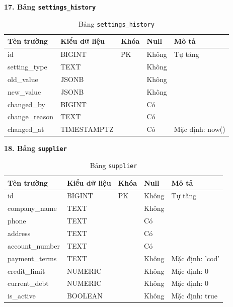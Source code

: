 \documentclass[12pt,a4paper]{report}
\begin{document}
\vspace{0.3cm}
\textbf{17. Bảng \texttt{settings\_history}}
\vspace{0.1cm}
\begin{longtable}{|>{\ttfamily}p{3.5cm}|p{2.5cm}|p{1.5cm}|p{1.5cm}|p{5cm}|}
\caption{Bảng \texttt{settings\_history}} \label{tab:db_settings_history} \\
\hline
\normalfont\textbf{Tên trường} & \textbf{Kiểu dữ liệu} & \textbf{Khóa} & \textbf{Null} & \textbf{Mô tả} \\ \hline
id & BIGINT & PK & Không & Tự tăng \\ \hline
setting\_type & TEXT & & Không & \\ \hline
old\_value & JSONB & & Không & \\ \hline
new\_value & JSONB & & Không & \\ \hline
changed\_by & BIGINT & & Có & \\ \hline
change\_reason & TEXT & & Có & \\ \hline
changed\_at & TIMESTAMPTZ & & Có & Mặc định: now() \\ \hline
\end{longtable}

\vspace{0.3cm}
\textbf{18. Bảng \texttt{supplier}}
\vspace{0.1cm}
\begin{longtable}{|>{\ttfamily}p{3.5cm}|p{2.5cm}|p{1.5cm}|p{1.5cm}|p{5cm}|}
\caption{Bảng \texttt{supplier}} \label{tab:db_supplier} \\
\hline
\normalfont\textbf{Tên trường} & \textbf{Kiểu dữ liệu} & \textbf{Khóa} & \textbf{Null} & \textbf{Mô tả} \\ \hline
id & BIGINT & PK & Không & Tự tăng \\ \hline
company\_name & TEXT & & Không & \\ \hline
phone & TEXT & & Có & \\ \hline
address & TEXT & & Có & \\ \hline
account\_number & TEXT & & Có & \\ \hline
payment\_terms & TEXT & & Không & Mặc định: 'cod' \\ \hline
credit\_limit & NUMERIC & & Không & Mặc định: 0 \\ \hline
current\_debt & NUMERIC & & Không & Mặc định: 0 \\ \hline
is\_active & BOOLEAN & & Không & Mặc định: true \\ \hline
\end{longtable}
\end{document}
